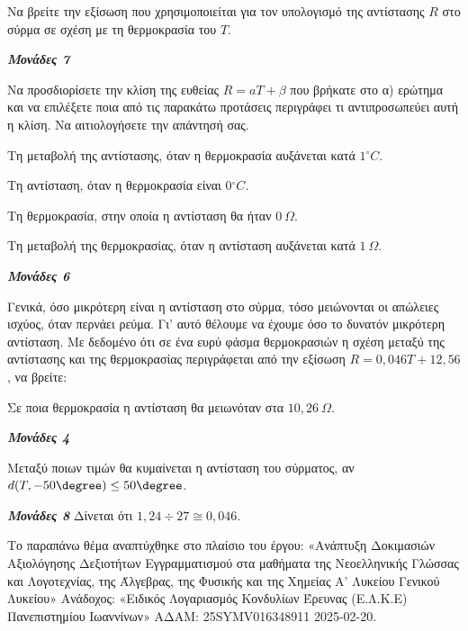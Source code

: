 \documentclass[11pt,a4paper,twoside]{book}
\newcommand{\monades}[1]{
\hspace*{\fill}
\textbf{\textit{\textcolor{maincolor}{Μονάδες #1}}}}
\begin{document}
\begin{alist}
\item Να βρείτε την εξίσωση που χρησιμοποιείται για τον υπολογισμό της αντίστασης $R$ στο σύρμα σε σχέση με τη θερμοκρασία του $T$.
\monades{7}
\item Να προσδιορίσετε την κλίση της ευθείας $R = a T + \beta$ που βρήκατε στο α) ερώτημα και να επιλέξετε ποια από τις παρακάτω προτάσεις περιγράφει τι αντιπροσωπεύει αυτή η κλίση. Να αιτιολογήσετε την απάντησή σας.

\begin{rlist}
\item Τη μεταβολή της αντίστασης, όταν η θερμοκρασία αυξάνεται κατά $1{^\circ}C$.

\item Τη αντίσταση, όταν η θερμοκρασία είναι $0{^\circ}C$.

\item Τη θερμοκρασία, στην οποία η αντίσταση θα ήταν $0\ \Omega$.

\item Τη μεταβολή της θερμοκρασίας, όταν η αντίσταση αυξάνεται κατά $1\ \Omega$.
\monades{6}
\end{rlist}
\item Γενικά, όσο μικρότερη είναι η αντίσταση στο σύρμα, τόσο μειώνονται οι απώλειες ισχύος, όταν περνάει ρεύμα. Γι' αυτό θέλουμε να έχουμε όσο το δυνατόν μικρότερη αντίσταση. Με δεδομένο ότι σε ένα ευρύ φάσμα θερμοκρασιών η σχέση μεταξύ της αντίστασης και της θερμοκρασίας περιγράφεται από την εξίσωση $R = 0,046T + 12,56$, να βρείτε:

\begin{rlist}
\item Σε ποια θερμοκρασία η αντίσταση θα μειωνόταν στα $10,26\ \Omega$.
\monades{4}
\item Μεταξύ ποιων τιμών θα κυμαίνεται η αντίσταση του σύρματος, αν $d(T, - 50\degree) \leq 50\degree$.
\monades{8}
Δίνεται ότι $1,24 \div 27 \cong 0,046$.

{\footnotesize Το παραπάνω θέμα αναπτύχθηκε στο πλαίσιο του έργου: «Ανάπτυξη Δοκιμασιών Αξιολόγησης Δεξιοτήτων Εγγραμματισμού στα μαθήματα της Νεοελληνικής Γλώσσας και Λογοτεχνίας, της Άλγεβρας, της Φυσικής και της Χημείας Α' Λυκείου Γενικού Λυκείου» Ανάδοχος: «Ειδικός Λογαριασμός Κονδυλίων Έρευνας (Ε.Λ.Κ.Ε) Πανεπιστημίου Ιωαννίνων» ΑΔΑΜ: 25SYMV016348911 2025-02-20.}
\end{rlist}
\end{alist}

\vspace{4mm}
\end{document}
